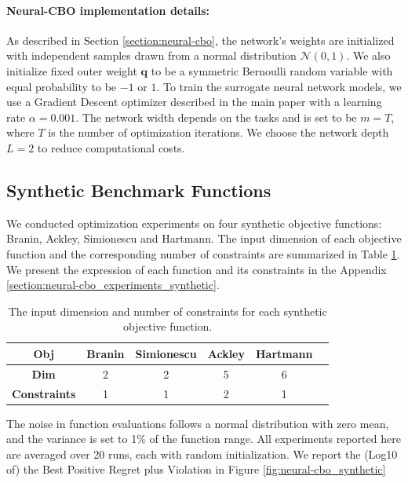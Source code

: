 \paragraph{Neural-CBO implementation details:}
As described in Section \ref{section:neural-cbo}, the network's weights are initialized with independent samples drawn from a normal distribution $\mathcal{N} (0, 1)$. We also initialize fixed outer weight $\mathbf{q}$ to be a symmetric Bernoulli random variable with equal probability to be $-1$ or $1$. To train the surrogate neural network models, we use a Gradient Descent optimizer described in the main paper with a learning rate $\alpha = 0.001$. The network width depends on the tasks and is set to be $m = T$, where $T$ is the number of optimization iterations. We choose the network depth $L=2$ to reduce computational costs. 

\subsection{Synthetic Benchmark Functions}
\label{section:neural-cbo_synthetic}
We conducted optimization experiments on four synthetic objective functions: Branin, Ackley, Simionescu and Hartmann. The input dimension of each objective function and the corresponding number of constraints are summarized in Table \ref{tab:neural-cbo_synthetic_info}. We present the expression of each function and its constraints in the Appendix \ref{section:neural-cbo_experiments_synthetic}. 
  \begin{table}[h]
  \centering
 \caption{The input dimension and number of constraints for each synthetic objective function.}
 \vspace{0.15in}
\begin{tabular}{|c|c|c|c|c|c|}
\hline
\textbf{Obj}              & Branin & Simionescu & Ackley & Hartmann  \\ \hline
\textbf{Dim}                   & 2   & 2               & 5 & 6                  \\ \hline
\textbf{Constraints}       & 1      & 1              & 2       & 1          \\ \hline
\end{tabular}
\label{tab:neural-cbo_synthetic_info}
\end{table}
The noise in function evaluations follows a normal distribution with zero mean, and the variance is set to 1\% of the function range. All experiments reported here are averaged over 20 runs, each with random initialization. We report the (Log10 of) the Best Positive Regret plus Violation in Figure \ref{fig:neural-cbo_synthetic}

